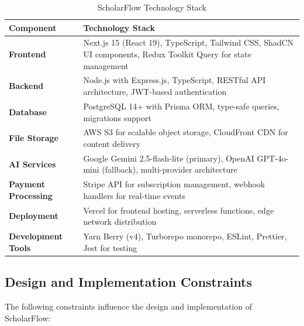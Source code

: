 \begin{table}[H]
    \centering
    \begin{tabularx}{\textwidth}{|l|X|}
        \hline
        \textbf{Component}          & \textbf{Technology Stack}                                                         \\
        \hline
        \textbf{Frontend}           &
        Next.js 15 (React 19), TypeScript, Tailwind CSS, ShadCN UI components, Redux Toolkit Query for state management \\
        \hline
        \textbf{Backend}            &
        Node.js with Express.js, TypeScript, RESTful API architecture, JWT-based authentication                         \\
        \hline
        \textbf{Database}           &
        PostgreSQL 14+ with Prisma ORM, type-safe queries, migrations support                                           \\
        \hline
        \textbf{File Storage}       &
        AWS S3 for scalable object storage, CloudFront CDN for content delivery                                         \\
        \hline
        \textbf{AI Services}        &
        Google Gemini 2.5-flash-lite (primary), OpenAI GPT-4o-mini (fallback), multi-provider architecture              \\
        \hline
        \textbf{Payment Processing} &
        Stripe API for subscription management, webhook handlers for real-time events                                   \\
        \hline
        \textbf{Deployment}         &
        Vercel for frontend hosting, serverless functions, edge network distribution                                    \\
        \hline
        \textbf{Development Tools}  &
        Yarn Berry (v4), Turborepo monorepo, ESLint, Prettier, Jest for testing                                         \\
        \hline
    \end{tabularx}
    \caption{ScholarFlow Technology Stack}
    \label{table:tech-stack}
\end{table}

\subsection{Design and Implementation Constraints}

The following constraints influence the design and implementation of ScholarFlow:


